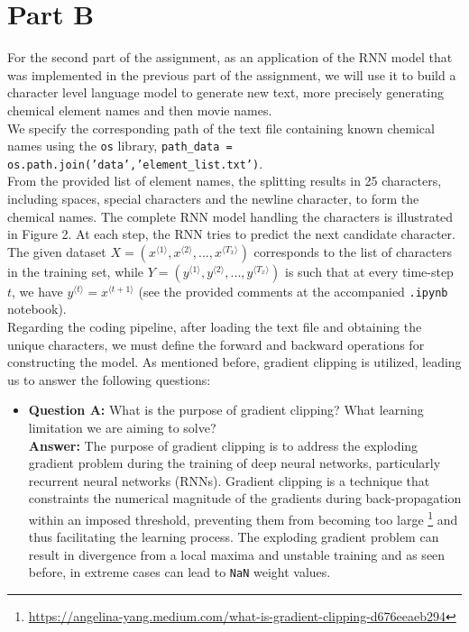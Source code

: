\documentclass{article}
\def\code#1{\texttt{#1}}
\begin{document}
\pagebreak

\section{Part B}

For the second part of the assignment, as an application of the RNN model that was implemented in the previous part of the assignment, we will use it to build a character level language model to generate new text, more precisely generating chemical element names and then movie names. \\

We specify the corresponding path of the text file containing known chemical names using the \code{os} library, \code{path\_data = os.path.join('data','element\_list.txt')}. \\

From the provided list of element names, the splitting results in 25 characters, including spaces, special characters and the newline character, to form the chemical names. The complete RNN model handling the characters is illustrated in Figure 2. At each step, the RNN tries to predict the next candidate character. The given dataset $X = (x^{\langle 1 \rangle}, x^{\langle 2 \rangle}, ..., x^{\langle T_x \rangle})$ corresponds to the list of characters in the training set, while $Y = (y^{\langle 1 \rangle}, y^{\langle 2 \rangle}, ..., y^{\langle T_x \rangle})$ is such that at every time-step $t$, we have $y^{\langle t \rangle} = x^{\langle t+1 \rangle}$ (see the provided comments at the accompanied \code{.ipynb} notebook). \\

Regarding the coding pipeline, after loading the text file and obtaining the unique characters, we must define the forward and backward operations for constructing the model. As mentioned before, gradient clipping is utilized, leading us to answer the following questions:

\begin{itemize}
	\item \textbf{Question A:} What is the purpose of gradient clipping? What learning limitation we are aiming to solve? \\
	
	\textbf{Answer:} The purpose of gradient clipping is to address the exploding gradient problem during the training of deep neural networks, particularly recurrent neural networks (RNNs). Gradient clipping is a technique that constraints the numerical magnitude of the gradients during back-propagation within an imposed threshold, preventing them from becoming too large \footnote{\url{https://angelina-yang.medium.com/what-is-gradient-clipping-d676eeaeb294}} and thus facilitating the learning process. The exploding gradient problem can result in divergence from a local maxima and unstable training and as seen before, in extreme cases can lead to \code{NaN} weight values.
	
\end{itemize}
\end{document}
